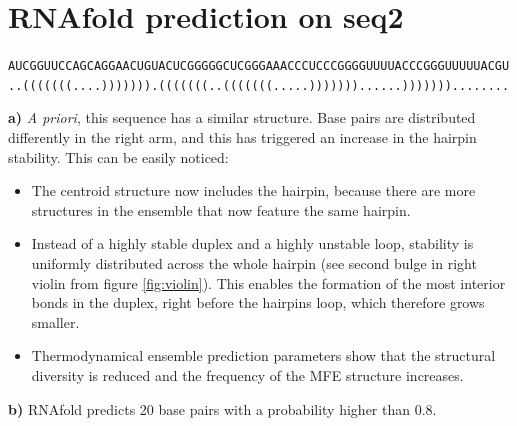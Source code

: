 \documentclass[10pt,a4paper]{article}
\begin{document}
\section{RNAfold prediction on seq2}


\small{\texttt{AUCGGUUCCAGCAGGAACUGUACUCGGGGGCUCGGGAAACCCUCCCGGGGUUUUACCCGGGUUUUUACGU}} \\
\texttt{..(((((((....))))))).(((((((..(((((((.....)))))))......)))))))........}

\textbf{a)} \textit{A priori}, this sequence has a similar structure. Base pairs are distributed differently in the right arm, and this has triggered an increase in the hairpin stability. This can be easily noticed:

\begin{itemize}

\item The centroid structure now includes the hairpin, because there are more structures in the ensemble that now feature the same hairpin.

\item Instead of a highly stable duplex and a highly unstable loop, stability is uniformly distributed across the whole hairpin (see second bulge in right violin from figure \ref{fig:violin}). This enables the formation of the most interior bonds in the duplex, right before the hairpin\textquotesingle s loop, which therefore grows smaller.

\item Thermodynamical ensemble prediction parameters show that the structural diversity is reduced and the frequency of the MFE structure increases.

\end{itemize}

\textbf{b)} RNAfold predicts 20 base pairs with a probability higher than 0.8.
\end{document}
